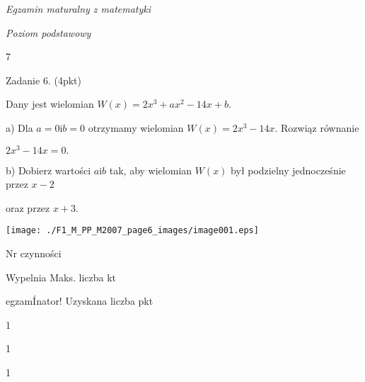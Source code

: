 \documentclass[a4paper,12pt]{article}
\begin{document}
{\it Egzamin maturalny z matematyki}

{\it Poziom podstawowy}

7

Zadanie 6. (4pkt)

Dany jest wielomian $W(x)=2x^{3}+ax^{2}-14x+b.$

a) Dla $a=0 \mathrm{i} b=0$ otrzymamy wielomian $W(x)=2x^{3}-14x$. Rozwiąz równanie

$2x^{3}-14x=0.$

b) Dobierz wartości $a\mathrm{i}b$ tak, aby wielomian $W(x)$ był podzielny jednocześnie przez $x-2$

oraz przez $x+3.$
\begin{center}
\texttt{[image: ./F1\_M\_PP\_M2007\_page6\_images/image001.eps]}
\end{center}
Nr czynności

Wypelnia Maks. liczba kt

egzamÍnator! Uzyskana liczba pkt

1

1

1
\end{document}
